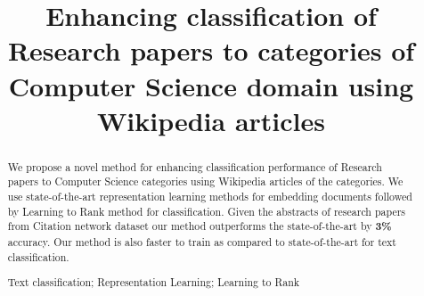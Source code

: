\documentclass[runningheads,a4paper]{llncs}
\newcommand{\keywords}[1]{\par\addvspace\baselineskip
\noindent\keywordname\enspace\ignorespaces#1}
\begin{document}
\mainmatter  %

\title{Enhancing classification of Research papers to categories of Computer Science domain using Wikipedia articles }

\titlerunning{}

%
%
%

%
%

\maketitle


\begin{abstract}
We propose a novel method for enhancing classification performance of Research papers to Computer Science categories using Wikipedia articles of the categories. We use state-of-the-art representation learning methods for embedding documents followed by Learning to Rank method for classification. Given the abstracts of research papers from Citation network dataset our method outperforms the state-of-the-art by {\bf 3\%} accuracy. Our method is also faster to train as compared to state-of-the-art for text classification.
\keywords{Text classification; Representation Learning; Learning to Rank}
\end{abstract}
\end{document}
